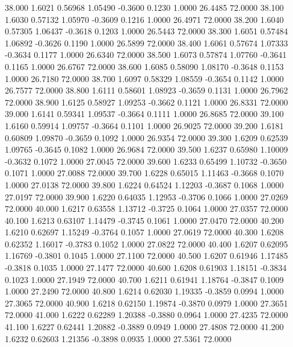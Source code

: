   38.000   1.6021   0.56968   1.05490  -0.3600   0.1230   1.0000  26.4485  72.0000
  38.100   1.6030   0.57132   1.05970  -0.3609   0.1216   1.0000  26.4971  72.0000
  38.200   1.6040   0.57305   1.06437  -0.3618   0.1203   1.0000  26.5443  72.0000
  38.300   1.6051   0.57484   1.06892  -0.3626   0.1190   1.0000  26.5899  72.0000
  38.400   1.6061   0.57674   1.07333  -0.3634   0.1177   1.0000  26.6340  72.0000
  38.500   1.6073   0.57874   1.07760  -0.3641   0.1165   1.0000  26.6767  72.0000
  38.600   1.6085   0.58090   1.08170  -0.3648   0.1153   1.0000  26.7180  72.0000
  38.700   1.6097   0.58329   1.08559  -0.3654   0.1142   1.0000  26.7577  72.0000
  38.800   1.6111   0.58601   1.08923  -0.3659   0.1131   1.0000  26.7962  72.0000
  38.900   1.6125   0.58927   1.09253  -0.3662   0.1121   1.0000  26.8331  72.0000
  39.000   1.6141   0.59341   1.09537  -0.3664   0.1111   1.0000  26.8685  72.0000
  39.100   1.6160   0.59914   1.09757  -0.3664   0.1101   1.0000  26.9025  72.0000
  39.200   1.6181   0.60809   1.09870  -0.3659   0.1092   1.0000  26.9354  72.0000
  39.300   1.6209   0.62539   1.09765  -0.3645   0.1082   1.0000  26.9684  72.0000
  39.500   1.6237   0.65980   1.10009  -0.3632   0.1072   1.0000  27.0045  72.0000
  39.600   1.6233   0.65499   1.10732  -0.3650   0.1071   1.0000  27.0088  72.0000
  39.700   1.6228   0.65015   1.11463  -0.3668   0.1070   1.0000  27.0138  72.0000
  39.800   1.6224   0.64524   1.12203  -0.3687   0.1068   1.0000  27.0197  72.0000
  39.900   1.6220   0.64035   1.12953  -0.3706   0.1066   1.0000  27.0269  72.0000
  40.000   1.6217   0.63558   1.13712  -0.3725   0.1064   1.0000  27.0357  72.0000
  40.100   1.6213   0.63107   1.14479  -0.3745   0.1061   1.0000  27.0470  72.0000
  40.200   1.6210   0.62697   1.15249  -0.3764   0.1057   1.0000  27.0619  72.0000
  40.300   1.6208   0.62352   1.16017  -0.3783   0.1052   1.0000  27.0822  72.0000
  40.400   1.6207   0.62095   1.16769  -0.3801   0.1045   1.0000  27.1100  72.0000
  40.500   1.6207   0.61946   1.17485  -0.3818   0.1035   1.0000  27.1477  72.0000
  40.600   1.6208   0.61903   1.18151  -0.3834   0.1023   1.0000  27.1949  72.0000
  40.700   1.6211   0.61941   1.18764  -0.3847   0.1009   1.0000  27.2490  72.0000
  40.800   1.6214   0.62030   1.19335  -0.3859   0.0994   1.0000  27.3065  72.0000
  40.900   1.6218   0.62150   1.19874  -0.3870   0.0979   1.0000  27.3651  72.0000
  41.000   1.6222   0.62289   1.20388  -0.3880   0.0964   1.0000  27.4235  72.0000
  41.100   1.6227   0.62441   1.20882  -0.3889   0.0949   1.0000  27.4808  72.0000
  41.200   1.6232   0.62603   1.21356  -0.3898   0.0935   1.0000  27.5361  72.0000
